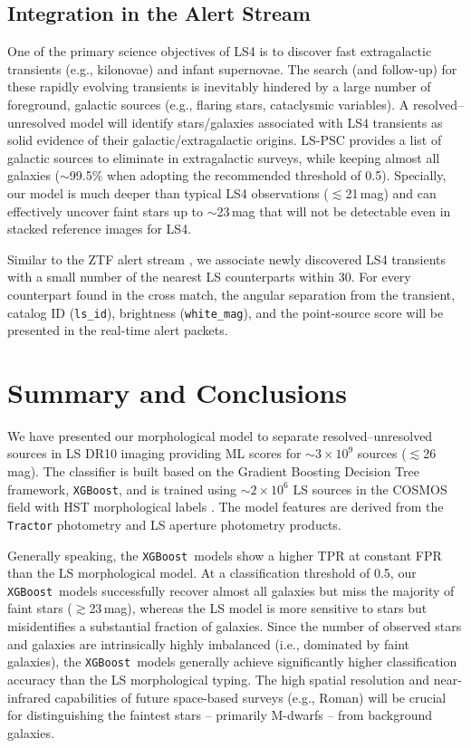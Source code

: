 \documentclass[twocolumn,tighten]{aastex631}
\newcommand{\xgboost}{\texttt{XGBoost}}
\newcommand{\dr}[1]{DR{#1}}
\begin{document}
\begin{CJK*}{UTF8}{gbsn}
\subsection{Integration in the Alert Stream}
One of the primary science objectives of LS4 is to discover fast extragalactic transients (e.g., kilonovae) and infant supernovae. The search (and follow-up) for these rapidly evolving transients is inevitably hindered by a large number of foreground, galactic sources (e.g., flaring stars, cataclysmic variables). A resolved--unresolved model will identify stars/galaxies associated with LS4 transients as solid evidence of their galactic/extragalactic origins. LS-PSC provides a list of galactic sources to eliminate in extragalactic surveys, while keeping almost all galaxies ($\sim$99.5\% when adopting the recommended threshold of 0.5). Specially, our model is much deeper than typical LS4 observations ($\lesssim$21\,mag) and can effectively uncover faint stars up to $\sim$23\,mag that will not be detectable even in stacked reference images for LS4.

Similar to the ZTF alert stream \citep{ZTF_data_2019}, we associate newly discovered LS4 transients with a small number of the nearest LS counterparts within 30\arcsec. For every counterpart found in the cross match, the angular separation from the transient, catalog ID (\texttt{ls\_id}), brightness (\texttt{white\_mag}), and the point-source score will be presented in the real-time alert packets.

\section{Summary and Conclusions}\label{sec:conclusion}
We have presented our morphological model to separate resolved--unresolved sources in LS \dr{10} imaging providing ML scores for $\sim$$3\times10^9$ sources ($\lesssim$26\,mag). The classifier is built based on the Gradient Boosting Decision Tree framework, \xgboost, and is trained using $\sim$$2\times10^6$ LS sources in the COSMOS field with HST morphological labels \citep{Leauthaud_2007}. The model features are derived from the \texttt{Tractor} photometry and LS aperture photometry products. 

Generally speaking, the \xgboost\ models show a higher TPR at constant FPR than the LS morphological model. At a classification threshold of 0.5, our \xgboost\ models successfully recover almost all galaxies but miss the majority of faint stars ($\gtrsim$23\,mag), whereas the LS model is more sensitive to stars but misidentifies a substantial fraction of galaxies. Since the number of observed stars and galaxies are intrinsically highly imbalanced (i.e., dominated by faint galaxies), the \xgboost\ models generally achieve significantly higher classification accuracy than the LS morphological typing. The high spatial resolution and near-infrared capabilities of future space-based surveys (e.g., Roman) will be crucial for distinguishing the faintest stars -- primarily M-dwarfs -- from background galaxies.


\end{CJK*}
\end{document}
